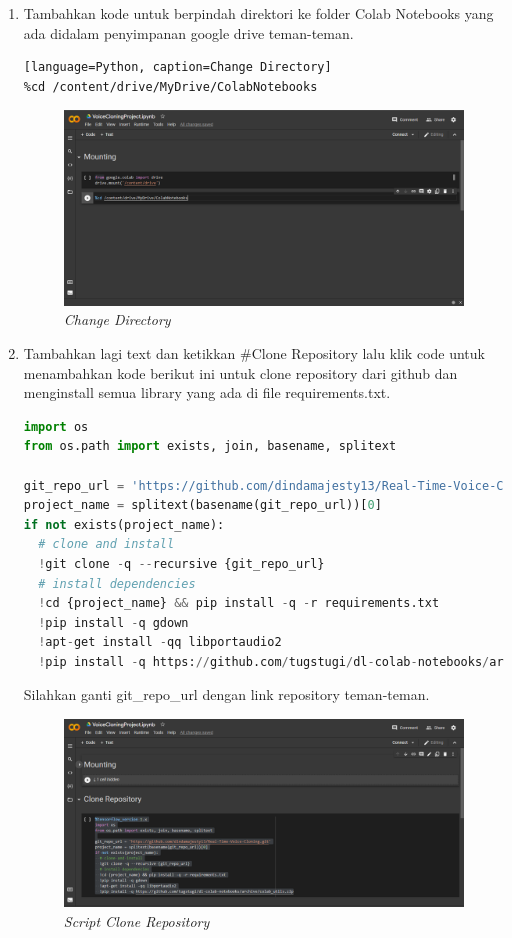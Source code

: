 \begin{enumerate}
\item Tambahkan kode untuk berpindah direktori ke folder Colab Notebooks yang ada didalam penyimpanan google drive teman-teman.
\begin{verbatim}[language=Python, caption=Change Directory]
%cd /content/drive/MyDrive/ColabNotebooks
\end{verbatim}
\begin{figure}[H]
    \centering
    \includegraphics[scale=0.75]{figures/colab6}
    \caption{\textit{Change Directory}}
    \label{colab6}
\end{figure}

\item Tambahkan lagi text dan ketikkan \#Clone Repository lalu klik code untuk menambahkan kode berikut ini untuk clone repository dari github dan menginstall semua library yang ada di file requirements.txt.

\begin{lstlisting}[language=Python, caption=Clone Repository]
%tensorflow_version 1.x
import os
from os.path import exists, join, basename, splitext

git_repo_url = 'https://github.com/dindamajesty13/Real-Time-Voice-Cloning.git'
project_name = splitext(basename(git_repo_url))[0]
if not exists(project_name):
  # clone and install
  !git clone -q --recursive {git_repo_url}
  # install dependencies
  !cd {project_name} && pip install -q -r requirements.txt
  !pip install -q gdown
  !apt-get install -qq libportaudio2
  !pip install -q https://github.com/tugstugi/dl-colab-notebooks/archive/colab_utils.zip
\end{lstlisting}

Silahkan ganti git\_repo\_url dengan link repository teman-teman.

\begin{figure}[H]
    \centering
    \includegraphics[scale=0.5]{figures/colab5}
    \caption{\textit{Script Clone Repository}}
    \label{colab5}
\end{figure}


\end{enumerate}
